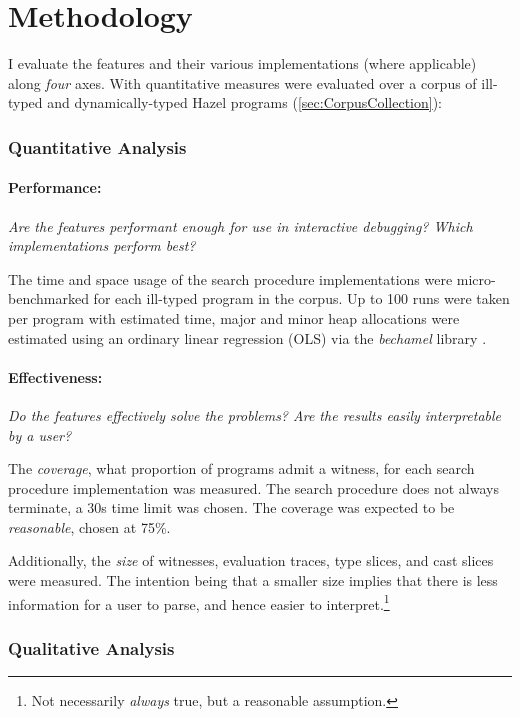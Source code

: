 \section{Methodology}\label{sec:EvaluationMethodology}
I evaluate the features and their various implementations (where applicable) along \textit{four} axes. With quantitative measures were evaluated over a corpus of ill-typed and dynamically-typed Hazel programs (\cref{sec:CorpusCollection}):

\subsubsection{Quantitative Analysis}
\paragraph{Performance: } \textit{Are the features performant enough for use in interactive debugging? Which implementations perform best?}

The time and space usage of the search procedure implementations were micro-benchmarked for each ill-typed program in the corpus. Up to 100 runs were taken per program with estimated time, major and minor heap allocations were estimated using an ordinary linear regression (OLS) via the \textit{bechamel} library \cite{Bechamel}.

\paragraph{Effectiveness: } \textit{Do the features effectively solve the problems? Are the results easily interpretable by a user?}

The \textit{coverage},  what proportion of programs admit a witness, for each search procedure implementation was measured. The search procedure does not always terminate, a 30s time limit was chosen. The coverage was expected to be \textit{reasonable}, chosen at 75\%.

Additionally, the \textit{size} of witnesses, evaluation traces, type slices, and cast slices were measured. The intention being that a smaller size implies that there is less information for a user to parse, and hence easier to interpret.\footnote{Not necessarily \textit{always} true, but a reasonable assumption.}

\subsubsection{Qualitative Analysis}
